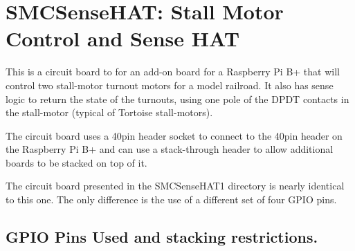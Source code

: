 %
%
%
%
% 
%
%
%
%
%
% 
%

\chapter{SMCSenseHAT: Stall Motor Control and Sense HAT}

This is a circuit board to for an add-on board for a Raspberry Pi B+ that will
control  two  stall-motor  turnout  motors for a model  railroad.  It also has
sense  logic to return the state of the  turnouts,  using one pole of the DPDT
contacts in the stall-motor (typical of Tortoise stall-motors).

The circuit board uses a 40pin header socket to connect to the 40pin header on
the  Raspberry Pi B+ and can use a  stack-through  header to allow  additional
boards to be stacked on top of it.

The circuit board presented in the SMCSenseHAT1 directory is nearly identical 
to this one.  The only difference is the use of a different set of four GPIO 
pins.

\section{GPIO Pins Used and stacking restrictions.}

